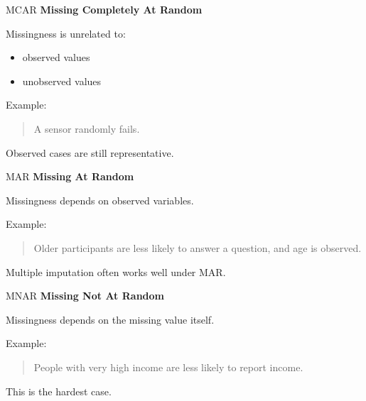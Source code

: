 \documentclass{beamer}
\begin{document}
\begin{frame}{MCAR}
\textbf{Missing Completely At Random}

\vspace{0.3cm}

Missingness is unrelated to:
\begin{itemize}
  \item observed values
  \item unobserved values
\end{itemize}

\vspace{0.3cm}

Example:

\begin{quote}
A sensor randomly fails.
\end{quote}

Observed cases are still representative.
\end{frame}

\begin{frame}{MAR}
\textbf{Missing At Random}

\vspace{0.3cm}

Missingness depends on observed variables.

\vspace{0.3cm}

Example:

\begin{quote}
Older participants are less likely to answer a question, and age is observed.
\end{quote}

\vspace{0.3cm}

Multiple imputation often works well under MAR.
\end{frame}

\begin{frame}{MNAR}
\textbf{Missing Not At Random}

\vspace{0.3cm}

Missingness depends on the missing value itself.

\vspace{0.3cm}

Example:

\begin{quote}
People with very high income are less likely to report income.
\end{quote}

\vspace{0.3cm}

This is the hardest case.
\end{frame}
\end{document}
